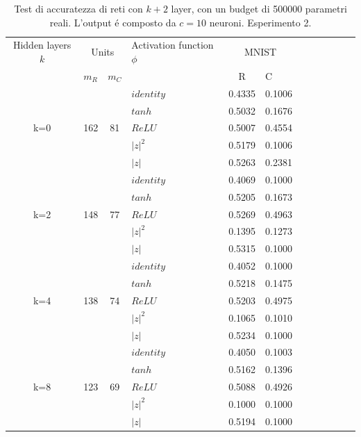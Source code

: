 \documentclass[a4paper,10pt]{article}
\begin{document}
 
 \begin{table}
  \centering
  \begin{tabular}{cp{} cp{} cp{}   cp{} cp{} cp{}}
   \cline{1-6}
   Hidden layers $k$ & \multicolumn{2}{c}{Units} $p_R$ & Activation function $\phi$ & \multicolumn{2}{c}{MNIST}\\
   \cline{2-3} \cline{5-6}
   & $m_R$ & $m_C$ & & R & C \\
   \cline{1-6}
   & & & $identity$ & 0.4335 & 0.1006 \\
   \cline{4-6}
   & & & $tanh$ & 0.5032 & 0.1676 \\
   \cline{4-6}
   k=0 & 162 & 81 & $ReLU$ & 0.5007 & 0.4554 \\
   \cline{4-6}
   & & & $|z|^2$ & 0.5179 & 0.1006 \\
   \cline{4-6}
   & & & $|z|$ & 0.5263 & 0.2381 \\
   \cline{1-6}
   
   \cline{1-6}
   & & & $identity$ & 0.4069 & 0.1000 \\
   \cline{4-6}
   & & & $tanh$ & 0.5205 & 0.1673 \\
   \cline{4-6}
   k=2 & 148 & 77 & $ReLU$ & 0.5269 & 0.4963 \\
   \cline{4-6}
   & & & $|z|^2$ & 0.1395 & 0.1273 \\
   \cline{4-6}
   & & & $|z|$ & 0.5315 & 0.1000 \\
   \cline{1-6}
   
   \cline{1-6}
   & & & $identity$ & 0.4052 & 0.1000 \\
   \cline{4-6}
   & & & $tanh$ & 0.5218 & 0.1475 \\
   \cline{4-6}
   k=4 & 138 & 74 & $ReLU$ & 0.5203 & 0.4975 \\
   \cline{4-6}
   & & & $|z|^2$ & 0.1065 & 0.1010 \\
   \cline{4-6}
   & & & $|z|$ & 0.5234 & 0.1000 \\
   \cline{1-6}
   
   \cline{1-6}
   & & & $identity$ & 0.4050 & 0.1003 \\
   \cline{4-6}
   & & & $tanh$ & 0.5162 & 0.1396 \\
   \cline{4-6}
   k=8 & 123 & 69 & $ReLU$ & 0.5088 & 0.4926 \\
   \cline{4-6}
   & & & $|z|^2$ & 0.1000 & 0.1000 \\
   \cline{4-6}
   & & & $|z|$ & 0.5194 & 0.1000 \\
   \cline{1-6}
      
  \end{tabular}
  \caption{Test di accuratezza di reti con $k+2$ layer, con un budget di 500000 parametri reali. L'output \'e composto da $c=10$ neuroni. Esperimento 2.}
  \label{MNIST2Tab}
 \end{table}
 
\end{document}
